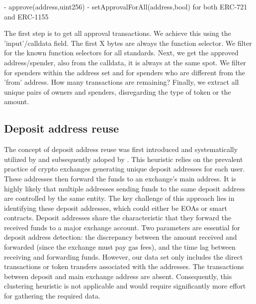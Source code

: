 \documentclass[12pt,a4paper,titlepage,oneside,english]{article}
\begin{document}
	- approve(address,uint256)
	- setApprovalForAll(address,bool) for both ERC-721 and ERC-1155
	
The first step is to get all approval transactions. We achieve this using the 'input'/calldata field. The first X bytes are always the function selector. We filter for the known function selectors for all standards. Next, we get the approved address/spender, also from the calldata, it is always at the same spot. We filter for spenders within the address set and for spenders who are different from the 'from' address. How many transactions are remaining? Finally, we extract all unique pairs of owners and spenders, disregarding the type of token or the amount.
\fi


\subsection{Deposit address reuse}
The concept of deposit address reuse was first introduced and systematically utilized by \cite{FV:17} and subsequently adoped by \cite{wu2022tutela}. This heuristic relies on the prevalent practice of crypto exchanges generating unique deposit addresses for each user. These addresses then forward the funds to an exchange's main address. It is highly likely that multiple addresses sending funds to the same deposit address are controlled by the same entity. The key challenge of this approach lies in identifying these deposit addresses, which could either be EOAs or smart contracts. \citep{FV:17}\newline
Deposit addresses share the characteristic that they forward the received funds to a major exchange account. Two parameters are essential for deposit address detection: the discrepancy between the amount received and forwarded (since the exchange must pay gas fees), and the time lag between receiving and forwarding funds.
However, our data set only includes the direct transactions or token transfers associated with the addresses. The transactions between deposit and main exchange address are absent. Consequently, this clustering heuristic is not applicable %
 and would require significantly more effort for gathering the required data.
\end{document}
